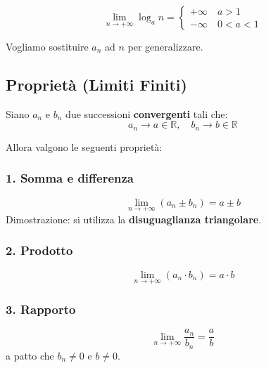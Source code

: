 \[
\lim_{n \to +\infty} \log_a n = 
\begin{cases}
+\infty \quad a>1\\
-\infty \quad 0<a<1
\end{cases}
\]

Vogliamo sostituire \(a_n\) ad \(n\) per generalizzare.

\subsection{Proprietà (Limiti Finiti)}\label{proprietuxe0}

Siano \(a_n\) e \(b_n\) due successioni \textbf{convergenti} tali che:  
\[a_n \to a \in \mathbb{R}, \quad b_n \to b \in \mathbb{R}\]

Allora valgono le seguenti proprietà:
\subsubsection{1. Somma e differenza}
\[
\lim_{n \to +\infty} (a_n \pm b_n) = a \pm b
\]
Dimostrazione: si utilizza la \textbf{disuguaglianza triangolare}.


\subsubsection{2. Prodotto}\label{prodotto}
\[
   \lim_{n \to +\infty} (a_n \cdot b_n) = a \cdot b
\]

\subsubsection{3. Rapporto}\label{rapporto}
\[
   \lim_{n \to +\infty} \frac{a_n}{b_n} = \frac{a}{b}
\]
a patto che \(b_n \neq 0\) e \(b \neq 0\).

